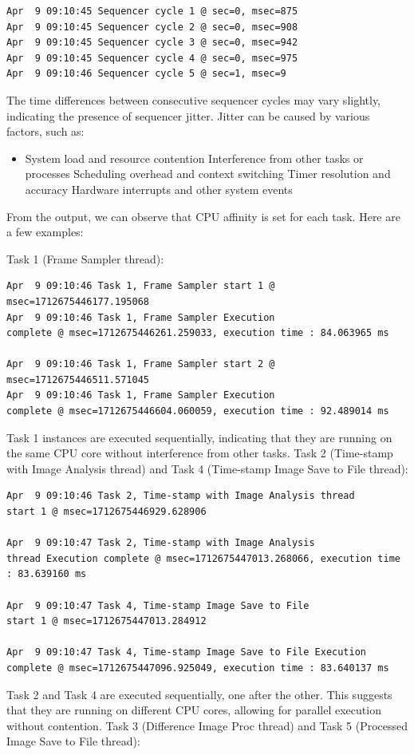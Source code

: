 \documentclass[a4paper,11pt]{article}%
\newenvironment{qanda}{\setlength{\parindent}{0pt}}{\bigskip}
\begin{document}
\begin{qanda}
\begin{enumerate}
			\begin{lstlisting}
Apr  9 09:10:45 Sequencer cycle 1 @ sec=0, msec=875
Apr  9 09:10:45 Sequencer cycle 2 @ sec=0, msec=908
Apr  9 09:10:45 Sequencer cycle 3 @ sec=0, msec=942
Apr  9 09:10:45 Sequencer cycle 4 @ sec=0, msec=975
Apr  9 09:10:46 Sequencer cycle 5 @ sec=1, msec=9
\end{lstlisting}
			The time differences between consecutive sequencer cycles may vary slightly, indicating the presence of sequencer jitter.
			Jitter can be caused by various factors, such as:
			\begin{itemize}
				\item System load and resource contention
				      Interference from other tasks or processes
				      Scheduling overhead and context switching
				      Timer resolution and accuracy
				      Hardware interrupts and other system events
			\end{itemize}



			From the output, we can observe that CPU affinity is set for each task. Here are a few examples:

			Task 1 (Frame Sampler thread):


			\begin{lstlisting}
Apr  9 09:10:46 Task 1, Frame Sampler start 1 @ msec=1712675446177.195068
Apr  9 09:10:46 Task 1, Frame Sampler Execution 
complete @ msec=1712675446261.259033, execution time : 84.063965 ms

Apr  9 09:10:46 Task 1, Frame Sampler start 2 @ msec=1712675446511.571045
Apr  9 09:10:46 Task 1, Frame Sampler Execution 
complete @ msec=1712675446604.060059, execution time : 92.489014 ms
\end{lstlisting}
			Task 1 instances are executed sequentially, indicating that they are running on the same CPU core without interference from other tasks.
			Task 2 (Time-stamp with Image Analysis thread) and Task 4 (Time-stamp Image Save to File thread):


			\begin{lstlisting}
Apr  9 09:10:46 Task 2, Time-stamp with Image Analysis thread 
start 1 @ msec=1712675446929.628906

Apr  9 09:10:47 Task 2, Time-stamp with Image Analysis 
thread Execution complete @ msec=1712675447013.268066, execution time : 83.639160 ms

Apr  9 09:10:47 Task 4, Time-stamp Image Save to File 
start 1 @ msec=1712675447013.284912

Apr  9 09:10:47 Task 4, Time-stamp Image Save to File Execution 
complete @ msec=1712675447096.925049, execution time : 83.640137 ms
\end{lstlisting}
			Task 2 and Task 4 are executed sequentially, one after the other. This suggests that they are running on different CPU cores, allowing for parallel execution without contention.
			Task 3 (Difference Image Proc thread) and Task 5 (Processed Image Save to File thread):



\end{enumerate}
\end{qanda}
\end{document}
